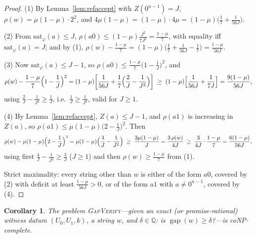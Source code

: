 \documentclass[11pt]{amsart}
\newtheorem{corollary}[theorem]{Corollary}
\theoremstyle{definition}
\theoremstyle{remark}
\newcommand{\Q}{\mathbb{Q}}
\newcommand{\gapp}{\operatorname{gap}}
\begin{document}
\begin{proof}
(1) By Lemma~\ref{lem:refaccept} with $Z(0^{n-1})=J$,
$\rho(w)=\mu(1-\mu)\cdot2^2$, and
$4\mu(1-\mu)=(1-\mu)\cdot4\mu
=(1-\mu)\bigl(\tfrac17+\tfrac1{56J}\bigr)$.

(2) From $\mathrm{sat}_\varphi(a)\le J$,
$\rho(a0)\le(1-\mu)\frac{J^2}{7J^2}=\frac{1-\mu}7$, with equality
iff $\mathrm{sat}_\varphi(a)=J$; and by (1),
$\rho(w)-\frac{1-\mu}7
=(1-\mu)\bigl(\tfrac17+\tfrac1{56J}-\tfrac17\bigr)
=\frac{1-\mu}{56J}$.

(3) Now $\mathrm{sat}_\varphi(a)\le J-1$, so
$\rho(a0)\le\frac{1-\mu}7\bigl(1-\frac1J\bigr)^2$, and
\[
  \rho(w)-\frac{1-\mu}7\Bigl(1-\frac1J\Bigr)^{2}
  =(1-\mu)\biggl[\frac1{56J}
  +\frac17\Bigl(\frac2J-\frac1{J^2}\Bigr)\biggr]
  \;\ge\;(1-\mu)\Bigl[\frac1{56J}+\frac1{7J}\Bigr]
  =\frac{9(1-\mu)}{56J},
\]
using $\frac2J-\frac1{J^2}\ge\frac1J$, i.e.\
$\frac1J\ge\frac1{J^2}$, valid for $J\ge1$.

(4) By Lemma~\ref{lem:refaccept}, $Z(a)\le J-1$, and $\rho(a1)$ is
increasing in $Z(a)$, so
$\rho(a1)\le\mu(1-\mu)\bigl(2-\frac1J\bigr)^2$. Then
\[
  \rho(w)-\mu(1-\mu)\Bigl(2-\frac1J\Bigr)^{2}
  =\mu(1-\mu)\Bigl(\frac4J-\frac1{J^2}\Bigr)
  \;\ge\;\frac{3\mu(1-\mu)}J
  =\frac{3\,\rho(w)}{4J}
  \;\ge\;\frac3{4J}\cdot\frac{1-\mu}7
  =\frac{6(1-\mu)}{56J},
\]
using first $\frac4J-\frac1{J^2}\ge\frac3J$ ($J\ge1$) and then
$\rho(w)\ge\frac{1-\mu}7$ from (1).

Strict maximality: every string other than $w$ is either of the form
$a0$, covered by (2) with deficit at least $\frac{1-\mu}{56J}>0$, or
of the form $a1$ with $a\ne0^{n-1}$, covered by (4).
\end{proof}

\begin{corollary}\label{cor:conp}
The problem \textup{\textsc{GapVerify}}---given an exact (or
promise-rational) witness datum $(U_0,U_1,k)$, a string $w$, and
$\delta\in\Q$: is $\gapp(w)\ge\delta$?---is coNP-complete.
\end{corollary}
\end{document}
